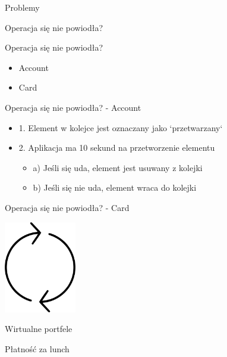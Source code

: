 \documentclass{beamer}
\begin{document}
\begin{frame}{Problemy}
	\begin{center}
		\Huge{Operacja się nie powiodła?}
	\end{center}
\end{frame}

\begin{frame}{Operacja się nie powiodła?}
	\begin{huge}
		\begin{itemize}
			\item Account
			\item Card
		\end{itemize}
	\end{huge}
\end{frame}

\begin{frame}{Operacja się nie powiodła? - Account}
	\begin{Large}
		\begin{itemize}[<+->]
			\item 1. Element w kolejce jest oznaczany jako `przetwarzany`
			\item 2. Aplikacja ma 10 sekund na przetworzenie elementu
			\begin{itemize}[<+->]
				\item \Large{a) Jeśli się uda, element jest usuwany z kolejki}
				\item \Large{b) Jeśli się nie uda, element wraca do kolejki}
			\end{itemize}
		\end{itemize}
	\end{Large}
\end{frame}

\begin{frame}{Operacja się nie powiodła? - Card}
	\begin{center}
		\includegraphics[height=4cm]{cykl1.png}
	\end{center}
\end{frame}

\begin{frame}{Wirtualne portfele}
	\begin{center}
		\Huge{Płatność za lunch}
	\end{center}
\end{frame}
\end{document}
